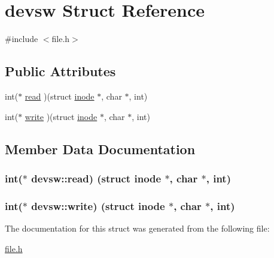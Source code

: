 \hypertarget{structdevsw}{}\section{devsw Struct Reference}
\label{structdevsw}


{\ttfamily \#include $<$file.\+h$>$}

\subsection*{Public Attributes}
\begin{DoxyCompactItemize}
\item 
int($\ast$ \hyperlink{structdevsw_a4efbe00d0031a1c9005ef2186947ea37}{read} )(struct \hyperlink{structinode}{inode} $\ast$, char $\ast$, int)
\item 
int($\ast$ \hyperlink{structdevsw_a87fd7af6c9a6fb8663fc206be7a233d4}{write} )(struct \hyperlink{structinode}{inode} $\ast$, char $\ast$, int)
\end{DoxyCompactItemize}


\subsection{Member Data Documentation}
\subsubsection[{\texorpdfstring{read}{read}}]{\setlength{\rightskip}{0pt plus 5cm}int($\ast$ devsw\+::read) (struct {\bf inode} $\ast$, char $\ast$, int)}\hypertarget{structdevsw_a4efbe00d0031a1c9005ef2186947ea37}{}\label{structdevsw_a4efbe00d0031a1c9005ef2186947ea37}
\subsubsection[{\texorpdfstring{write}{write}}]{\setlength{\rightskip}{0pt plus 5cm}int($\ast$ devsw\+::write) (struct {\bf inode} $\ast$, char $\ast$, int)}\hypertarget{structdevsw_a87fd7af6c9a6fb8663fc206be7a233d4}{}\label{structdevsw_a87fd7af6c9a6fb8663fc206be7a233d4}


The documentation for this struct was generated from the following file\+:\begin{DoxyCompactItemize}
\item 
\hyperlink{file_8h}{file.\+h}\end{DoxyCompactItemize}
